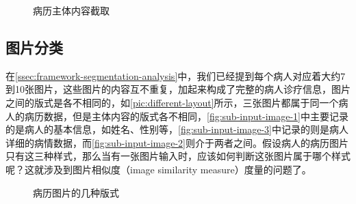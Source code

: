 \begin{figure}[htbp]
  \centering
  \caption{病历主体内容截取}
  \label{pic:different-layout}
\end{figure}

\subsection{图片分类}
在\autoref{ssec:framework-segmentation-analysis}中，我们已经提到每个病人对应着大约7到10张图片，这些图片的内容互不重复，加起来构成了完整的病人诊疗信息，图片之间的版式是各不相同的，如\autoref{pic:different-layout}所示，三张图片都属于同一个病人的病历数据，但是主体内容的版式各不相同，\autoref{fig:sub-input-image-1}中主要记录的是病人的基本信息，如姓名、性别等，\autoref{fig:sub-input-image-3}中记录的则是病人详细的病情数据，而\autoref{fig:sub-input-image-2}则介于两者之间。假设病人的病历图片只有这三种样式，那么当有一张图片输入时，应该如何判断这张图片属于哪个样式呢？这就涉及到图片相似度（image similarity measure）度量的问题了。

\begin{figure}[htbp]
  \centering
  \caption{病历图片的几种版式}
  \label{pic:different-layout}
\end{figure}

